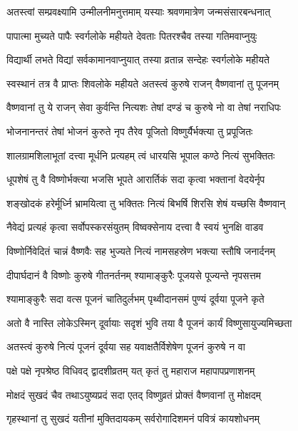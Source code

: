 \twolineshloka
{अतस्त्वां सम्प्रवक्ष्यामि उन्मीलनीमनुत्तमाम्}
{यस्याः श्रवणमात्रेण जन्मसंसारबन्धनात्}%

\twolineshloka
{पापात्मा मुच्यते पापैः स्वर्गलोके महीयते}
{देवताः पितरश्चैव तस्या गतिमवाप्नुयुः}%

\twolineshloka
{विद्यार्थी लभते विद्यां सर्वकामानवाप्नुयात्}
{तस्या व्रतान्न सन्देहः स्वर्गलोके महीयते}%

\twolineshloka
{स्वस्थानं तत्र वै प्राप्तः शिवलोके महीयते}
{अतस्त्वं कुरुषे राजन् वैष्णवानां तु पूजनम्}%

\twolineshloka
{वैष्णवानां तु ये राजन् सेवा कुर्वन्ति नित्यशः}
{तेषां दण्डं च कुरुषे नो वा तेषां नराधिपः}%

\twolineshloka
{भोजनानन्तरं तेषां भोजनं कुरुते नृप}
{तैरेव पूजितो विष्णुर्यैर्भक्त्या तु प्रपूजितः}%

\twolineshloka
{शालग्रामशिलाभूतां दत्त्वा मूर्धनि प्रत्यहम्}
{त्वं धारयसि भूपाल कण्ठे नित्यं सुभक्तितः}%

\twolineshloka
{धूपशेषं तु वै विष्णोर्भक्त्या भजसि भूपते}
{आरार्तिकं सदा कृत्वा भक्तानां वेदयेर्नृप}%

\twolineshloka
{शङ्खोदकं हरेर्मूर्ध्नि भ्रामयित्वा तु भक्तितः}
{नित्यं बिभर्षि शिरसि शेषं यच्छसि वैष्णवान्}%

\twolineshloka
{नैवेद्यं प्रत्यहं कृत्वा सर्वोपस्करसंयुतम्}
{विष्वक्सेनाय दत्त्वा वै स्वयं भुनक्षि वाडव}%

\twolineshloka
{विष्णोर्निवेदितं चान्नं वैष्णवैः सह भुज्यते}
{नित्यं नामसहस्रेण भक्त्या स्तौषि जनार्दनम्}%

\twolineshloka
{दीपार्घदानं वै विष्णोः कुरुषे गीतनर्तनम्}
{श्यामाङ्कुरैः पूजयसे पूज्यन्ते नृपसत्तम}%

\twolineshloka
{श्यामाङ्कुरैः सदा वत्स पूजनं चातिदुर्लभम्}
{पृथ्वीदानसमं पुण्यं दूर्वया पूजने कृते}%

\twolineshloka
{अतो वै नास्ति लोकेऽस्मिन् दूर्वायाः सदृशं भुवि}
{तया वै पूजनं कार्यं विष्णुसायुज्यमिच्छता}%

\twolineshloka
{अतस्त्वं कुरुषे नित्यं पूजनं दूर्वया सह}
{यवाक्षतैर्विशेषेण पूजनं कुरुषे न वा}%

\twolineshloka
{पक्षे पक्षे नृपश्रेष्ठ विधिवद् द्वादशीव्रतम्}
{यत् कृतं तु महाराज महापापप्रणाशनम्}%

\twolineshloka
{मोक्षदं सुखदं चैव तथाऽयुष्यप्रदं सदा}
{एतद् विष्णुव्रतं प्रोक्तं वैष्णवानां तु मोक्षदम्}%

\twolineshloka
{गृहस्थानां तु सुखदं यतीनां मुक्तिदायकम्}
{सर्वरोगादिशमनं पवित्रं कायशोधनम्}%

